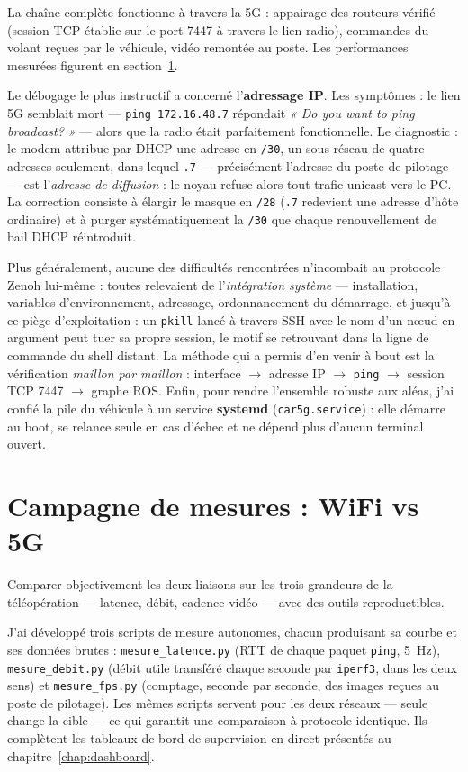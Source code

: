 \resultats
La chaîne complète fonctionne à travers la 5G : appairage des routeurs vérifié
(session TCP établie sur le port 7447 à travers le lien radio), commandes du
volant reçues par le véhicule, vidéo remontée au poste. Les performances
mesurées figurent en section~\ref{sec:campagne-mesures}.

\discussion
Le débogage le plus instructif a concerné l'\textbf{adressage IP}. Les
symptômes : le lien 5G semblait mort --- \texttt{ping 172.16.48.7} répondait
\emph{« Do you want to ping broadcast? »} --- alors que la radio était
parfaitement fonctionnelle. Le diagnostic : le modem attribue par DHCP une
adresse en \texttt{/30}, un sous-réseau de quatre adresses seulement, dans
lequel \texttt{.7} --- précisément l'adresse du poste de pilotage --- est
l'\emph{adresse de diffusion} : le noyau refuse alors tout trafic unicast vers
le PC. La correction consiste à élargir le masque en \texttt{/28}
(\texttt{.7} redevient une adresse d'hôte ordinaire) et à purger
systématiquement la \texttt{/30} que chaque renouvellement de bail DHCP
réintroduit.

Plus généralement, aucune des difficultés rencontrées n'incombait au protocole
Zenoh lui-même : toutes relevaient de l'\emph{intégration système} ---
installation, variables d'environnement, adressage, ordonnancement du
démarrage, et jusqu'à ce piège d'exploitation : un \texttt{pkill}
lancé à travers SSH avec le nom d'un nœud en argument peut tuer sa propre
session, le motif se retrouvant dans la ligne de commande du shell distant.
La méthode qui a permis d'en venir à bout est la vérification \emph{maillon
par maillon} : interface $\rightarrow$ adresse IP $\rightarrow$ \texttt{ping}
$\rightarrow$ session TCP 7447 $\rightarrow$ graphe ROS. Enfin, pour rendre
l'ensemble robuste aux aléas, j'ai confié la pile du véhicule à un service
\textbf{systemd} (\texttt{car5g.service}) : elle démarre au boot, se relance
seule en cas d'échec et ne dépend plus d'aucun terminal ouvert.

\section{Campagne de mesures : WiFi vs 5G}
\label{sec:campagne-mesures}

\objectif
Comparer objectivement les deux liaisons sur les trois grandeurs de la
téléopération --- latence, débit, cadence vidéo --- avec des outils
reproductibles.

\methodes
J'ai développé trois scripts de mesure autonomes, chacun produisant sa courbe
et ses données brutes : \texttt{mesure\_latence.py} (RTT de chaque paquet
\texttt{ping}, 5~Hz), \texttt{mesure\_debit.py} (débit utile transféré chaque
seconde par \texttt{iperf3}, dans les deux sens) et \texttt{mesure\_fps.py}
(comptage, seconde par seconde, des images reçues au poste de pilotage). Les
mêmes scripts servent pour les deux réseaux --- seule change la cible --- ce
qui garantit une comparaison à protocole identique. Ils complètent les
tableaux de bord de supervision en direct présentés au
chapitre~\ref{chap:dashboard}.

